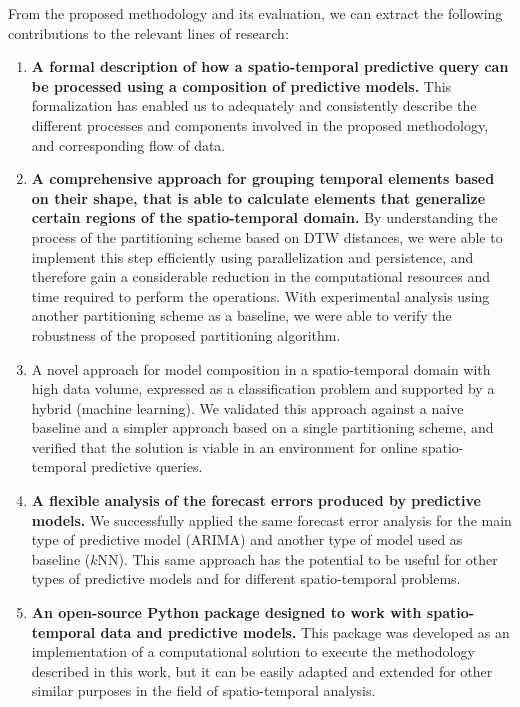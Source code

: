 From the proposed methodology and its evaluation, we can extract the following contributions to the relevant lines of research:

\begin{enumerate}
\item \textbf{A formal description of how a spatio-temporal predictive query can be processed using a composition of predictive models.} This formalization has enabled us to adequately and consistently describe the different processes and components involved in the proposed methodology, and corresponding flow of data.

\item \textbf{A comprehensive approach for grouping temporal elements based on their shape, that is able to calculate elements that generalize certain regions of the spatio-temporal domain.} By understanding the process of the partitioning scheme based on DTW distances, we were able to implement this step efficiently using parallelization and persistence, and therefore gain a considerable reduction in the computational resources and time required to perform the operations. With experimental analysis using another partitioning scheme as a baseline, we were able to verify the robustness of the proposed partitioning algorithm.

\item A novel approach for model composition in a spatio-temporal domain with high data volume, expressed as a classification problem and supported by a hybrid (machine learning). We validated this approach against a naive baseline and a simpler approach based on a single partitioning scheme, and verified that the solution is viable in an environment for online spatio-temporal predictive queries.

\item \textbf{A flexible analysis of the forecast errors produced by predictive models.} We successfully applied the same forecast error analysis for the main type of predictive model (ARIMA) and another type of model used as baseline ($k$NN). This same approach has the potential to be useful for other types of predictive models and for different spatio-temporal problems.

\item \textbf{An open-source Python package designed to work with spatio-temporal data and predictive models.} This package was developed as an implementation of a computational solution to execute the methodology described in this work, but it can be easily adapted and extended for other similar purposes in the field of spatio-temporal analysis.
\end{enumerate}


